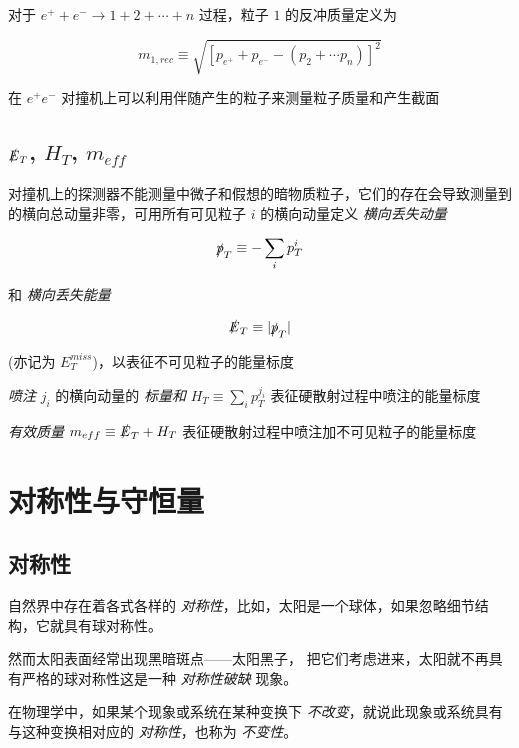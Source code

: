 对于 $e^+ + e^- \to 1 + 2 + \cdots + n$ 过程，粒子 $1$ 的反冲质量定义为

\begin{equation}
    m_{1, rec} \equiv \sqrt{[p_{e^+} + p_{e^-} - (p_2 + \cdots p_n)]^2}
\end{equation}

在 $e^+ e^-$ 对撞机上可以利用伴随产生的粒子来测量粒子质量和产生截面

\subsection{\texorpdfstring{$\slashed{E}_T$}{ET}, \texorpdfstring{$H_T$}{HT}, \texorpdfstring{$m_{eff}$}{meff}}

对撞机上的探测器不能测量中微子和假想的暗物质粒子，它们的存在会导致测量到的横向总动量非零，可用所有可见粒子 $i$ 的横向动量定义 \emph{横向丢失动量}

\begin{equation}
    \slashed{p}_T \equiv -\sum_i p^i_T
\end{equation}

和 \emph{横向丢失能量}

\begin{equation}
    \slashed{E}_T \equiv |\slashed{p}_T|
\end{equation}

(亦记为 $E^{miss}_T$)，以表征不可见粒子的能量标度

\emph{喷注} $j_i$ 的横向动量的 \emph{标量和} $H_T \equiv \sum_i p^{j_i}_T$ 表征硬散射过程中喷注的能量标度

\emph{有效质量} $m_{eff} \equiv \slashed{E}_T + H_T$ 表征硬散射过程中喷注加不可见粒子的能量标度

\section{对称性与守恒量}

\subsection{对称性}

自然界中存在着各式各样的 \emph{对称性}，比如，太阳是一个球体，如果忽略细节结构，它就具有球对称性。

然而太阳表面经常出现黑暗斑点——太阳黑子， 把它们考虑进来，太阳就不再具有严格的球对称性这是一种 \emph{对称性破缺} 现象。

在物理学中，如果某个现象或系统在某种变换下 \emph{不改变}，就说此现象或系统具有
与这种变换相对应的 \emph{对称性}，也称为 \emph{不变性}。

